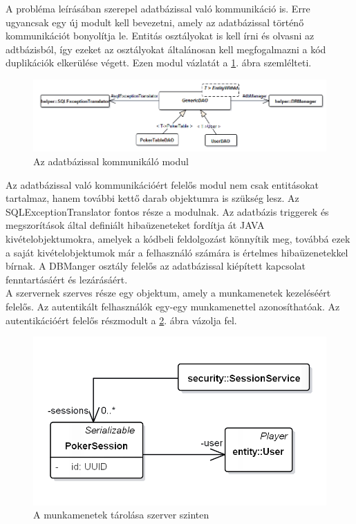 A probléma leírásában szerepel adatbázissal való kommunikáció is. Erre ugyancsak egy új modult kell bevezetni, amely az adatbázissal történő kommunikációt bonyolítja le. Entitás osztályokat is kell írni és olvasni az adtbázisból, így ezeket az osztályokat általánosan kell megfogalmazni a kód duplikációk elkerülése végett. Ezen modul vázlatát a \ref{fig:persist}. ábra szemlélteti. \\
\begin{figure}[h!]
	\caption{Az adatbázissal kommunikáló modul}
	\label{fig:persist}
	\centering
	\includegraphics[width=\linewidth]{developer-documentation/images/dao.png}
\end{figure}
Az adatbázissal való kommunikációért felelős modul nem csak entitásokat tartalmaz, hanem további kettő darab objektumra is szükség lesz. Az SQLExceptionTranslator fontos része a modulnak. Az adatbázis triggerek és megszorítások által definiált hibaüzeneteket fordítja át JAVA kivételobjektumokra, amelyek a kódbeli feldolgozást könnyítik meg, továbbá ezek a saját kivételobjektumok már a felhasználó számára is értelmes hibaüzenetekkel bírnak. A DBManger osztály felelős az adatbázissal kiépített kapcsolat fenntartásáért és lezárásáért. \\
A szervernek szerves része egy objektum, amely a munkamenetek kezeléséért felelős. Az autentikált felhasználók egy-egy munkamenettel azonosíthatóak. Az autentikációért felelős részmodult a \ref{fig:sessionservice}. ábra vázolja fel.
\begin{figure}[h!]
	\caption{A munkamenetek tárolása szerver szinten}
	\label{fig:sessionservice}
	\centering
	\includegraphics[width=\linewidth]{developer-documentation/images/session.png}
\end{figure}

